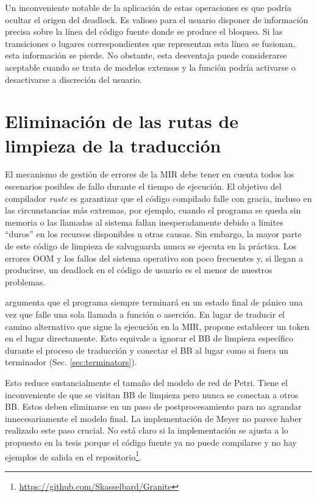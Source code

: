 Un inconveniente notable de la aplicación de estas operaciones es que podría ocultar el origen
del deadlock. Es valioso para el usuario disponer de información precisa sobre la línea del
código fuente donde se produce el bloqueo. Si las transiciones o lugares correspondientes que
representan esta línea se fusionan, esta información se pierde. No obstante, esta desventaja
puede considerarse aceptable cuando se trata de modelos extensos y la función podría activarse
o desactivarse a discreción del usuario.

\section{Eliminación de las rutas de limpieza de la traducción}
\label{sec:future-work-no-cleanup}

El mecanismo de gestión de errores de la \acrshort{MIR} debe tener en cuenta todos los escenarios
posibles de fallo durante el tiempo de ejecución. El objetivo del compilador \emph{rustc} es garantizar
que el código compilado falle con gracia, incluso en las circunstancias más extremas, por
ejemplo, cuando el programa se queda sin memoria o las llamadas al sistema fallan
inesperadamente debido a límites ``duros'' en los recursos disponibles u otras causas. Sin
embargo, la mayor parte de este código de limpieza de salvaguarda nunca se ejecuta en la
práctica. Los errores \acrshort{OOM} y los fallos del sistema operativo son poco frecuentes y, si llegan a
producirse, un deadlock en el código de usuario es el menor de nuestros problemas.

\cite{meyer2020} argumenta que el programa siempre terminará en un estado final de pánico una vez
que falle una sola llamada a función o aserción. En lugar de traducir el camino alternativo que sigue
la ejecución en la MIR, propone establecer un token en el lugar 
directamente. Esto equivale a ignorar el \acrshort{BB} de limpieza específico durante el proceso de
traducción y conectar el \acrshort{BB} al lugar 
como si fuera un terminador  (Sec. \ref{sec:terminators}).

Esto reduce sustancialmente el tamaño del modelo de red de Petri. Tiene el inconveniente de
que se visitan \acrshort{BB} de limpieza pero nunca se conectan a otros \acrshort{BB}.
Estos deben eliminarse en un paso de postprocesamiento para no agrandar innecesariamente el modelo final.
La implementación de Meyer no parece haber realizado este paso crucial.
No está claro si la implementación se ajusta a lo
propuesto en la tesis porque el código fuente ya no puede compilarse y no hay ejemplos de
salida en el repositorio\footnote{\url{https://github.com/Skasselbard/Granite}}.

